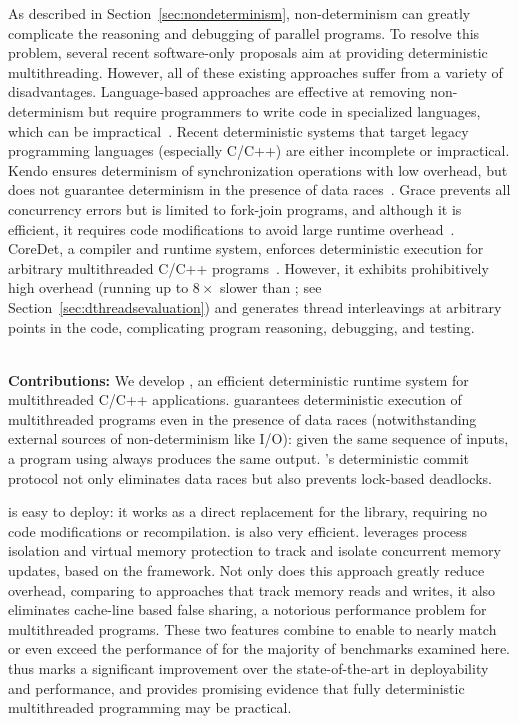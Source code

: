
\label{chapter:dthreads}

As described in Section~\ref{sec:nondeterminism}, non-determinism can greatly complicate the reasoning and debugging of parallel programs. To resolve this problem, several recent software-only proposals aim at providing deterministic multithreading. However, all of these existing approaches suffer from a variety of disadvantages. Language-based approaches are effective at removing non-determinism but require programmers to write code in specialized languages, which can be impractical~\cite{Bocchino:2009:TES:1640089.1640097,Burckhardt:2010:CPR:1869459.1869515,Simpson:1999:SEE:330346.330357}. Recent deterministic systems that target legacy programming languages (especially C/C++) are either incomplete or impractical. Kendo ensures determinism of synchronization operations with low overhead, but does not guarantee determinism in the presence of data races~\cite{1508256}. Grace prevents all concurrency errors but is limited to fork-join programs, and although it is efficient, it requires code modifications to avoid large runtime overhead~\cite{grace}. CoreDet, a compiler and runtime system, enforces deterministic execution for arbitrary multithreaded C/C++ programs~\cite{Bergan:2010:CCR:1736020.1736029}. However, it exhibits prohibitively high overhead (running up to $8\times$ slower than \pthreads{}; see Section~\ref{sec:dthreadsevaluation}) and generates thread interleavings at arbitrary points in the code, complicating program reasoning, debugging, and testing.

\hspace{1em} \\
\noindent
\textbf{Contributions:}
We develop \textbf{\dthreads{}}, an efficient deterministic runtime system for multithreaded C/C++ applications. \dthreads{} guarantees deterministic execution of multithreaded programs even in the presence of data races (notwithstanding external sources of non-determinism like I/O): given the same sequence of inputs, a program using \dthreads{} always produces the same output. \dthreads{}'s deterministic commit protocol not only eliminates data races but also prevents lock-based deadlocks.

\dthreads{} is easy to deploy: it works as a direct replacement for the \pthreads{} library, requiring no code modifications or
recompilation. \dthreads{} is also very efficient. \dthreads{} leverages process isolation and virtual memory protection to track and isolate concurrent memory updates, based on the \sheriff{} framework. Not only does this approach greatly reduce overhead, comparing to approaches that track memory reads and writes, it also eliminates cache-line based false sharing, a notorious performance problem for multithreaded
programs. These two features combine to enable \dthreads{} to nearly match or even exceed the performance of \pthreads{} for the majority of benchmarks examined here. \dthreads{} thus marks a significant improvement over the state-of-the-art in deployability and performance, and provides promising evidence that fully deterministic multithreaded programming may be practical.

